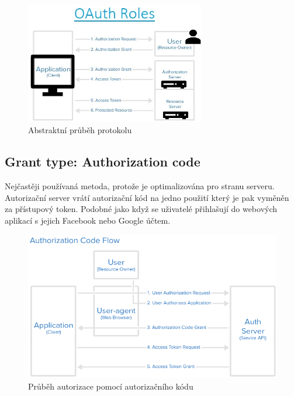 \begin{figure}[H]
    \centering
    \includegraphics[width=0.7\textwidth]{figures/OAuth_abstract_flow.png}
    \caption{Abstraktní průběh protokolu}%
    \label{fig:Oauth_roles_diagram}
\end{figure}

\subsection{Grant type: Authorization code}
Nejčastěji používaná metoda, protože je optimalizována pro stranu serveru. Autorizační server vrátí autorizační kód na jedno použití který je pak vyměněn za přístupový token. Podobné jako když se uživatelé přihlašují do webových aplikací s jejich Facebook nebo Google účtem.

\begin{figure}[ht]
    \centering
    \includegraphics[width=\textwidth]{figures/OAuth_code_flow.png}
    \caption[short]{Průběh autorizace pomocí autorizačního kódu}%
    \label{fig:Oauth_auth_flow}
\end{figure}


